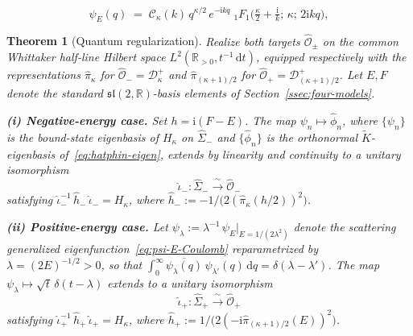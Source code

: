 \documentclass[10pt,a4paper]{amsart}
\newtheorem{theorem}{Theorem}
\newcommand{\D}{\mathcal{D}}
\newcommand{\Kt}{\widetilde{K}}
\newcommand{\OOh}{\widehat{\mathcal{O}}}
\newcommand{\R}{\mathbb{R}}
\newcommand{\Sigmah}{\widehat{\Sigma}}
\newcommand{\ii}{\mathrm{i}}
\newcommand{\sltwo}{\mathfrak{sl}(2,\R)}
\begin{document}
\begin{equation}\label{eq:psi-E-Coulomb}
  \psi_{E}(q)\;=\;\mathcal{C}_{\kappa}(k)\,q^{\kappa/2}\,e^{-\ii kq}\;
    {}_{1}F_{1}\!\bigl(\tfrac{\kappa}{2}+\tfrac{\ii}{k};\,\kappa;\,2\ii kq\bigr),
\end{equation}

\begin{theorem}[Quantum regularization]\label{thm:iotahat}
Realize both targets $\OOh_{\pm}$ on the common Whittaker half-line Hilbert space
$L^{2}(\R_{>0},t^{-1}\,\mathrm{d}t)$, equipped respectively with the representations
$\hat\pi_{\kappa}$ for $\OOh_{-}=\D^{+}_{\kappa}$ and $\hat\pi_{(\kappa+1)/2}$
for $\OOh_{+}=\D^{+}_{(\kappa+1)/2}$. Let $E,F$ denote the standard
$\sltwo$-basis elements of Section~\ref{ssec:four-models}.

\smallskip\noindent\textbf{(i) Negative-energy case.}
Set $h=\ii(F-E)$. The map $\psi_{n}\mapsto\hat\phi_{n}$, where
$\{\psi_{n}\}$ is the bound-state eigenbasis of $H_{\kappa}$ on $\Sigmah_{-}$
and $\{\hat\phi_{n}\}$ is the orthonormal $\Kt$-eigenbasis
of~\eqref{eq:hatphin-eigen}, extends by linearity and continuity to a unitary
isomorphism
\[
  \hat\iota_{-}\colon\Sigmah_{-}\xrightarrow{\;\sim\;}\OOh_{-}
\]
satisfying $\hat\iota_{-}^{-1}\,\hat h_{-}\,\hat\iota_{-}=H_{\kappa}$, where
$\hat h_{-}:=-1/\bigl(2(\hat\pi_{\kappa}(h/2))^{2}\bigr)$.

\smallskip\noindent\textbf{(ii) Positive-energy case.}
Let $\psi_{\lambda}:=\lambda^{-1}\,\psi_{E}\big|_{E=1/(2\lambda^{2})}$ denote the
scattering generalized eigenfunction~\eqref{eq:psi-E-Coulomb} reparametrized by
$\lambda=(2E)^{-1/2}>0$, so that
$\int_{0}^{\infty}\overline{\psi_{\lambda}(q)}\,\psi_{\lambda'}(q)\,\mathrm{d}q
=\delta(\lambda-\lambda')$. The map $\psi_{\lambda}\mapsto\sqrt{t}\,\delta(t-\lambda)$
extends to a unitary isomorphism
\[
  \hat\iota_{+}\colon\Sigmah_{+}\xrightarrow{\;\sim\;}\OOh_{+}
\]
satisfying $\hat\iota_{+}^{-1}\,\hat h_{+}\,\hat\iota_{+}=H_{\kappa}$, where
$\hat h_{+}:=1/\bigl(2(-\ii\hat\pi_{(\kappa+1)/2}(E))^{2}\bigr)$.
\end{theorem}
\end{document}
